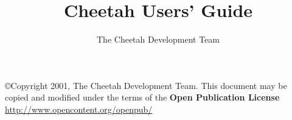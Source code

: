 \documentclass{howto}
\title{Cheetah Users' Guide}
\author{The Cheetah Development Team}
\begin{document}
\maketitle


\tableofcontents

\copyright{Copyright 2001, The Cheetah Development Team.
      This document may be copied and modified under the terms of the
      {\bf Open Publication License} \url{http://www.opencontent.org/openpub/}
}

    
    
    
    
    
    
    
    
    
    
    
    
    
    

    \appendix
    
    
    
    
    
\end{document}
